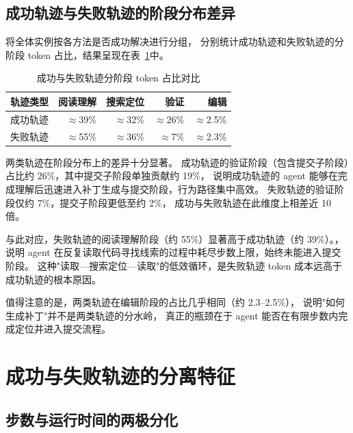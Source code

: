 \subsection{成功轨迹与失败轨迹的阶段分布差异}                                                                
\label{subsec:phase-success-vs-failure}                                             
将全体实例按各方法是否成功解决进行分组，     
分别统计成功轨迹和失败轨迹的分阶段 token 占比，结果呈现在表~\ref{tab:phase-success-fail}中。                
\begin{table}[htbp]
  \centering
  \caption{成功与失败轨迹分阶段 token 占比对比}
  \label{tab:phase-success-fail}
  \setlength{\tabcolsep}{5pt}
  \begin{tabular}{lrrrr}
    \toprule
    轨迹类型 & 阅读理解 & 搜索定位 & 验证 & 编辑 \\
    \midrule
    成功轨迹 & $\approx$39\% & $\approx$32\% & $\approx$26\% & $\approx$2.5\% \\
    失败轨迹 & $\approx$55\% & $\approx$36\% & $\approx$7\%  & $\approx$2.3\% \\
    \bottomrule
  \end{tabular}
\end{table}

两类轨迹在阶段分布上的差异十分显著。
成功轨迹的验证阶段（包含提交子阶段）占比约 26\%，其中提交子阶段单独贡献约 19\%，
说明成功轨迹的 agent 能够在完成理解后迅速进入补丁生成与提交阶段，行为路径集中高效。
失败轨迹的验证阶段仅约 7\%，提交子阶段更低至约 2\%，
成功与失败轨迹在此维度上相差近 10 倍。

与此对应，失败轨迹的阅读理解阶段（约 55\%）显著高于成功轨迹（约 39\%）。，
说明 agent 在反复读取代码寻找线索的过程中耗尽步数上限，始终未能进入提交阶段。
这种"读取—搜索定位—读取"的低效循环，是失败轨迹 token 成本远高于成功轨迹的根本原因。

值得注意的是，两类轨迹在编辑阶段的占比几乎相同（约 2.3--2.5\%），
说明"如何生成补丁"并不是两类轨迹的分水岭，
真正的瓶颈在于 agent 能否在有限步数内完成定位并进入提交流程。



\section{成功与失败轨迹的分离特征}
\label{sec:success-failure}

\subsection{步数与运行时间的两极分化}
\label{subsec:steps-runtime}

